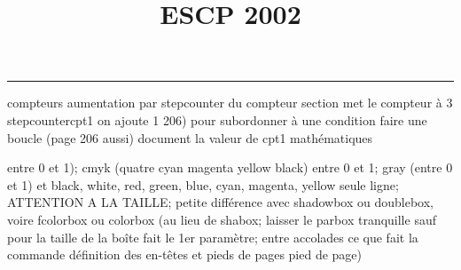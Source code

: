 \documentclass[11pt]{article}%
\title{\bf \vspace{-2cm} ESCP 2002} %
\author{} %
\date{} %
\renewcommand{\headrulewidth}{0pt}%
\renewcommand{\footrulewidth}{0.4pt}%
\begin{document}
\maketitle %
\vspace{-1.4cm}\hrule %
\thispagestyle{fancy}

\vspace*{.2cm}



compteurs%
aumentation par stepcounter du compteur section%
met le compteur à 3%
stepcounter{cpt1} on ajoute 1%
206) pour subordonner à une condition %
faire une boucle (page 206 aussi) %
document la valeur de cpt1 
mathématiques\newcommand{\ch}{\operatorname{ch}} 
\newcommand{\sh}{\operatorname{sh}}
\renewcommand{\tanh}{\operatorname{th}}
\renewcommand{\sinh}{\operatorname{sh}}
\renewcommand{\cosh}{\operatorname{ch}}
\newcommand{\argsh}{\operatorname{argsh}}
\newcommand{\argch}{\operatorname{argch}}
\newcommand{\argth}{\operatorname{argth}}
\newcommand{\ker}{\operatorname{Ker}}
\renewcommand{\im}{\operatorname{Im}}
\newcommand{\rg}{\operatorname{rg}}
\newcommand{\Id}{\operatorname{Id}}
\newcommand{\id}{\operatorname{id}}
\renewcommand{\leq}{\leq}
\renewcommand{\geq}{\geq }

entre 0 et 1); cmyk (quatre cyan magenta yellow black) entre 0 et 1;
gray (entre 0 et 1) et black, white, red, green, blue, cyan, magenta,
yellow%
seule ligne; ATTENTION A LA TAILLE; petite différence avec shadowbox ou
doublebox, voire fcolorbox ou colorbox (au lieu de shabox; laisser le
parbox tranquille sauf pour la taille de la boîte
\newcommand{\Tbox}[1]{\begin{center} \shabox{\parbox{0.6
\linewidth}{#1}} \end{center}} %
fait le 1er paramètre; entre accolades ce que fait la commande
définition des en-têtes et pieds de pages\pagestyle{fancy}
\chead{}
\rfoot[ \ \thepage]{\thepage}
\cfoot{}
\lfoot{}
\thispagestyle{fancy} %
pied de page)\renewcommand{\footrulewidth}{0.4pt}
\renewcommand{\headrulewidth}{0.4pt}
\end{document}
